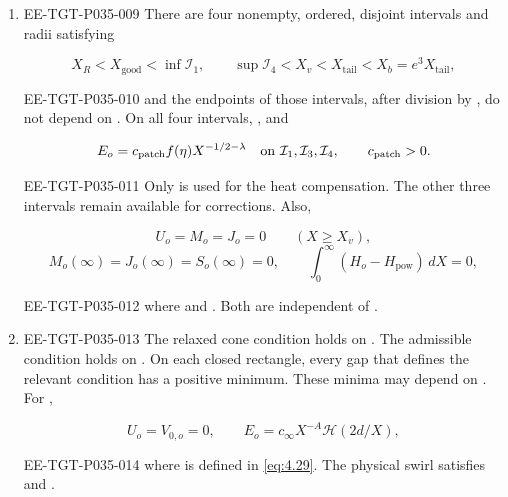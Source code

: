 \begin{lemma}
\begin{enumerate}[label=(\roman*)]
\item
\begin{EESegment}{EE-TGT-P035-009}
There are four nonempty, ordered, disjoint intervals
 and radii satisfying
\end{EESegment}
\[
  X_R<X_{\mathrm{good}}<\inf\mathcal{I}_1,\qquad
  \sup\mathcal{I}_4<X_v<X_{\mathrm{tail}}<X_b=e^3X_{\mathrm{tail}},
\]
\begin{EESegment}{EE-TGT-P035-010}
and the endpoints of those intervals, after division by
, do not depend on
. On all four intervals,
, and
\end{EESegment}
\[
  E_o=c_{\mathrm{patch}}f(\eta)X^{-1/2-\lambda}\quad\hbox{on }\mathcal{I}_1,\mathcal{I}_3,\mathcal{I}_4,
  \qquad c_{\mathrm{patch}}>0.
\]
\begin{EESegment}{EE-TGT-P035-011}
Only  is used for the heat compensation.
The other three intervals remain available for corrections. Also,
\end{EESegment}
\[
  U_o=M_o=J_o=0\qquad(X\geq X_v),
\]
\[
  M_o(\infty)=J_o(\infty)=S_o(\infty)=0,
  \qquad \int_0^\infty(H_o-H_{\mathrm{pow}})\,dX=0,
\]
\begin{EESegment}{EE-TGT-P035-012}
where  and
. Both
 are independent of
.
\end{EESegment}

\item
\begin{EESegment}{EE-TGT-P035-013}
The relaxed cone condition holds on
.
The admissible condition holds on
.
On each closed rectangle, every gap that defines the relevant condition has
a positive minimum. These minima may depend on
. For ,
\end{EESegment}
\[
  U_o=V_{0,o}=0,\qquad E_o=c_\infty X^{-A}\mathcal{H}(2d/X),
\]
\begin{EESegment}{EE-TGT-P035-014}
where  is defined in \eqref{eq:4.29}. The
physical swirl
 satisfies
and .
\end{EESegment}
\end{enumerate}
\end{lemma}

